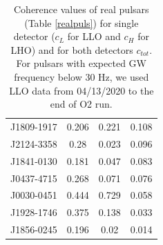 \documentclass[11pt,a4paper,final]{iopart}
\begin{document}
\begin{center}
\begin{table}[h!]
\begin{tabular}[t]{c|ccc}
J1809-1917 & 0.206 & 0.221 & 0.108 \\
J2124-3358 & 0.28  & 0.023 & 0.096 \\
J1841-0130 & 0.181 & 0.047 & 0.083 \\
J0437-4715 & 0.268 & 0.071 & 0.076 \\
J0030-0451  & 0.444 & 0.729 & 0.058 \\
J1928-1746 & 0.375 & 0.138 & 0.033 \\
J1856-0245 & 0.196 & 0.02  & 0.014 \\
\bottomrule
\end{tabular}
 \caption{ Coherence values of real pulsars (Table \ref{realpuls}) for single detector ($c_L$ for LLO and $c_H$ for LHO) and for both detectors $c_{tot}$. For pulsars with expected GW frequency below $30$ Hz,  we used LLO data from 04/13/2020 to the end of O2 run.}
\label{realpulscohe}
\end{table}
\end{center}

\clearpage
\end{document}
